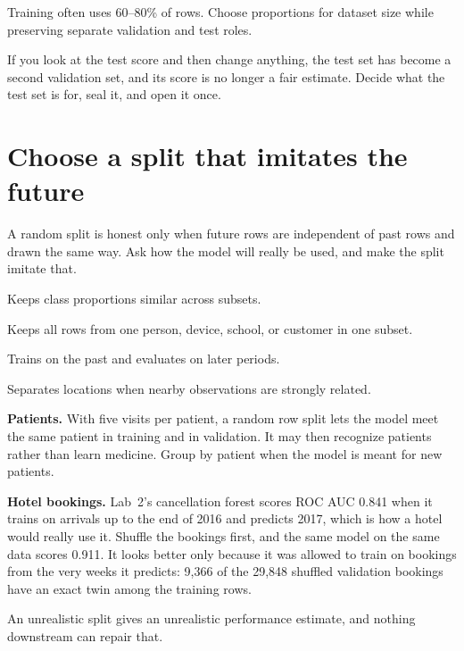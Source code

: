Training often uses 60--80\% of rows. Choose proportions for dataset size while preserving separate validation and test roles.

\begin{pitfall}
If you look at the test score and then change anything, the test set has become a second validation set, and its score is no longer a fair estimate. Decide what the test set is for, seal it, and open it once.
\end{pitfall}

\section{Choose a split that imitates the future}

A random split is honest only when future rows are independent of past rows and drawn the same way. Ask how the model will really be used, and make the split imitate that.

\begin{description}[leftmargin=1.35in,style=nextline]
  \item[Stratified split] Keeps class proportions similar across subsets.
  \item[Group split] Keeps all rows from one person, device, school, or customer in one subset.
  \item[Time split] Trains on the past and evaluates on later periods.
  \item[Spatial split] Separates locations when nearby observations are strongly related.
\end{description}

\begin{workedexample}
\textbf{Patients.} With five visits per patient, a random row split lets the model meet the same patient in training and in validation. It may then recognize patients rather than learn medicine. Group by patient when the model is meant for new patients.

\textbf{Hotel bookings.} Lab~2's cancellation forest scores ROC AUC 0.841 when it trains on arrivals up to the end of 2016 and predicts 2017, which is how a hotel would really use it. Shuffle the bookings first, and the same model on the same data scores 0.911. It looks better only because it was allowed to train on bookings from the very weeks it predicts: 9,366 of the 29,848 shuffled validation bookings have an exact twin among the training rows.
\end{workedexample}

\begin{pitfall}
An unrealistic split gives an unrealistic performance estimate, and nothing downstream can repair that.
\end{pitfall}

